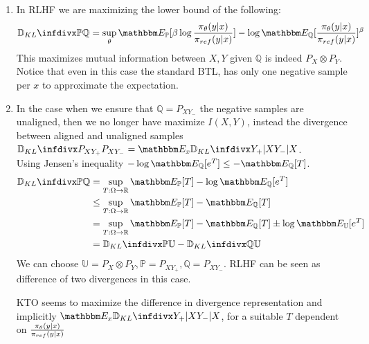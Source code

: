 \documentclass{article}
\begin{document}
\begin{enumerate}
    \item In RLHF we are maximizing the lower bound of the following:
    \begin{equation}
        \infdiv{\mathbb{P}}{\mathbb{Q}}=\sup\limits_{\theta}\bE_\mathbb{P}[\beta\log\frac{\pi_\theta(y|x)}{\pref(y|x)}]-\log \bE_\mathbb{Q}[\frac{\pi_\theta(y|x)}{\pref(y|x)}]^\beta
        \label{eqn: KL_loss_dpo}
    \end{equation}
    This maximizes mutual information between $X,Y$ given $\mathbb{Q}$ is indeed $P_X\otimes P_Y$. Notice that even in this case the standard BTL, has only one negative sample per $x$ to approximate the expectation.
    \item In the case when we ensure that $\mathbb{Q}=P_{XY_-}$ the negative samples are unaligned, then we no longer have maximize $I(X,Y)$, instead the divergence between aligned and unaligned samples $\infdiv{P_{XY_+}}{P_{XY_-}}=\bE_x\infdiv{Y_+|X}{Y_-|X}$.\\
    Using Jensen's inequality $-\log \bE_\mathbb{Q}[e^T]\leq -\bE_\mathbb{Q}[T]$.
    \begin{align}
        \infdiv{\mathbb{P}}{\mathbb{Q}}&=\sup\limits_{T:\Omega\to\reals}\bE_\mathbb{P}[T]-\log \bE_\mathbb{Q}[e^T]\\
        &\leq \sup\limits_{T:\Omega\to\reals}\bE_\mathbb{P}[T]-\bE_\mathbb{Q}[T]\label{eqn:KL_loss_kto}\\
        &=\sup\limits_{T:\Omega\to\reals}\bE_\mathbb{P}[T]-\bE_\mathbb{Q}[T]\pm \log \bE_\mathbb{U}[e^T]\\
        &=\infdiv{\mathbb{P}}{\mathbb{U}}-\infdiv{\mathbb{Q}}{\mathbb{U}}
    \end{align}
    We can choose $\mathbb{U}=P_{X}\otimes P_{Y},\mathbb{P}=P_{XY_+},\mathbb{Q}=P_{XY_-}$. RLHF can be seen as difference of two divergences in this case. 
    \begin{remark}
        KTO \cite{Ethayarajh2024KTO:Optimization} seems to maximize the difference in divergence representation and implicitly $\bE_x\infdiv{Y_+|X}{Y_-|X}$, for a suitable $T$ dependent on $\frac{\pi_\theta(y|x)}{\pi_{ref}(y|x)}$
    \end{remark}
    
\end{enumerate}
\end{document}
